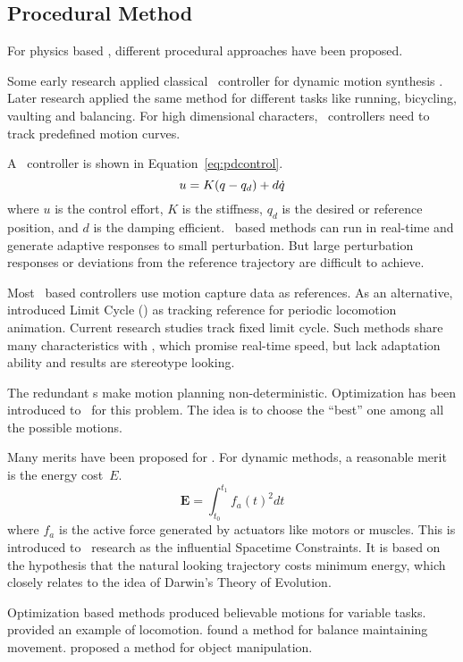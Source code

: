 \subsection{Procedural Method}
For physics based \cms, different procedural approaches have been proposed.
\begin{itemize}




Some early research applied classical \pd\ controller for dynamic motion synthesis \citep{Raibert1991}.
Later research \citep{Hodgins1995} applied the same method for different tasks like running, bicycling, vaulting and balancing. 
For high dimensional characters, \pd\ controllers need to  track predefined motion curves\citep{Yin2007}.

A \pd\ controller is shown in Equation~\ref{eq:pdcontrol}.
\begin{equation}
\label{eq:pdcontrol}
u=K(q -q_d)+d\dot{q}
\end{equation}
where $u$ is the control effort, $K$ is the stiffness, $q_d$ is the desired or reference position, and $d$ is the damping efficient.
\pd\ based methods can run in real-time and generate adaptive responses to small perturbation.
But large perturbation responses or deviations from the reference trajectory are difficult to achieve.


Most \pd\ based controllers use motion capture data as references.
As an alternative, \citet{Laszlo1996} introduced Limit Cycle (\lc) as tracking reference for periodic locomotion animation. 
Current research studies\citep{Coros2009,coros2010generalized,Laszlo1996} track fixed limit cycle.
Such methods share many characteristics with \pd, which promise real-time speed, but lack adaptation ability and results are stereotype looking.







The redundant \dof s make motion planning non-deterministic.
Optimization has been introduced to \cms\ for this problem.
The idea is to choose the ``best'' one among all the possible motions.

Many merits have been proposed for \cms.
For dynamic methods, a reasonable merit is the energy cost~$E$. 
\begin{equation}
 \textbf{E}=\int_{t_0}^{t_1}f_{a}(t)^2dt
\end{equation}
where $f_{a}$ is the active force generated by actuators like motors or muscles. 
This is introduced to \cms\ research as the influential Spacetime Constraints\citep{Witkin1988}. 
It is based on the hypothesis that the natural looking trajectory costs minimum energy,
which closely relates to the idea of Darwin's Theory of Evolution. 

Optimization based  methods produced believable motions for variable tasks. 
\citet{Jain2009} provided an example of locomotion.  
\citet{BalanceControl} found a method for balance maintaining movement. 
\citet{Liu2009} proposed a method for object manipulation. 
\end{itemize}


